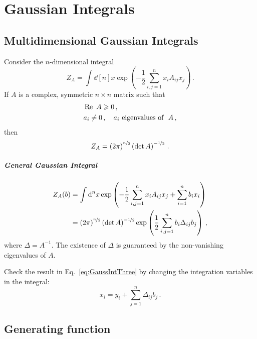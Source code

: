 \documentclass[notes.tex]{subfiles}
\begin{document}
\chapter{Gaussian Integrals}
\label{chap:lec0}

\section{Multidimensional Gaussian Integrals}
\label{sec:mult-gauss-integr}

Consider the $n$-dimensional integral
\begin{equation}
  \label{eq:GaussIntOne}
  Z_A = \int \dd[n]{x} \exp\left(
    -\frac12 \sum_{i,j=1}^n x_i A_{ij} x_j
    \right)\, .
\end{equation}
If $A$ is a complex, symmetric $n\times n$ matrix such that
\begin{align}
  & \Re\ A \geqslant 0 \, ,\\
  & a_i \neq 0\, , \quad a_i\ \text{eigenvalues of }\ A\, ,
\end{align}
then 
\begin{equation}
  \label{eq:GaussIntTwo}
  Z_A = \left(2\pi\right)^{\nicefrac{n}{2}} \left(\det A \right)^{-\nicefrac{1}{2}}\, .
\end{equation}

\paragraph{General Gaussian Integral}

\begin{align}
  Z_A(b) &= \int \dd[n]{x} \exp\left(
  -\frac12 \sum_{i,j=1}^n x_i A_{ij} x_j
  + \sum_{i=1}^n b_i x_i
  \right) \\
  \label{eq:GaussIntThree}
  &=  \left(2\pi\right)^{\nicefrac{n}{2}} \left(\det A \right)^{-\nicefrac{1}{2}}
    \exp\left(
  \frac12 \sum_{i,j=1}^n b_i \Delta_{ij} b_j
  \right) \, ,
\end{align}
where $\Delta = A^{-1}$. The existence of $\Delta$ is guaranteed by the non-vanishing eigenvalues of $A$.
\begin{Ex}
  Check the result in Eq.~\ref{eq:GaussIntThree} by changing the integration variables in the integral:
  \[
    x_i = y_i + \sum_{j=1}^n \Delta_{ij} b_j\, .
  \]
\end{Ex}

\section{Generating function}
\label{sec:generating-function}
\end{document}

